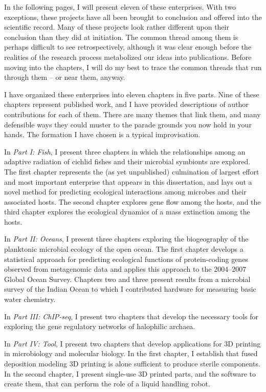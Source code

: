 In the following pages, I will present eleven of these enterprises. With two exceptions, these projects have all been brought to conclusion and offered into the scientific record. Many of these projects look rather different upon their conclusion than they did at initiation. The common thread among them is perhaps difficult to see retrospectively, although it was clear enough before the realities of the research process metabolized our ideas into publications. Before moving into the chapters, I will do my best to trace the common threads that run through them -- or near them, anyway.

I have organized these enterprises into eleven chapters in five parts. Nine of these chapters represent published work, and I have provided descriptions of author contributions for each of them. There are many themes that link them, and many defensible ways they could muster to the parade grounds you now hold in your hands. The formation I have chosen is a typical improvisation.

In {\em Part I: Fish}, I present three chapters in which the relationships among an adaptive radiation of cichlid fishes and their microbial symbionts are explored. The first chapter represents the (as yet unpublished) culmination of largest effort and most important enterprise that appears in this dissertation, and lays out a novel method for predicting ecological interactions among microbes and their associated hosts. The second chapter explores gene flow among the hosts, and the third chapter explores the ecological dynamics of a mass extinction among the hosts.

In {\em Part II: Oceans}, I present three chapters exploring the biogeography of the planktonic microbial ecology of the open ocean. The first chapter develops a statistical approach for predicting ecological functions of protein-coding genes observed from metagenomic data and applies this approach to the 2004--2007 Global Ocean Survey. Chapters two and three present results from a microbial survey of the Indian Ocean to which I contributed hardware for measuring basic water chemistry.

In {\em Part III: ChIP-seq}, I present two chapters that develop the necessary tools for exploring the gene regulatory networks of halophilic archaea.

In {\em Part IV: Tool}, I present two chapters that develop applications for 3D printing in microbiology and molecular biology. In the first chapter, I establish that fused deposition modeling 3D printing is alone sufficient to produce sterile components. In the second chapter, I present single-use 3D printed parts, and the software to create them, that can perform the role of a liquid handling robot. 

